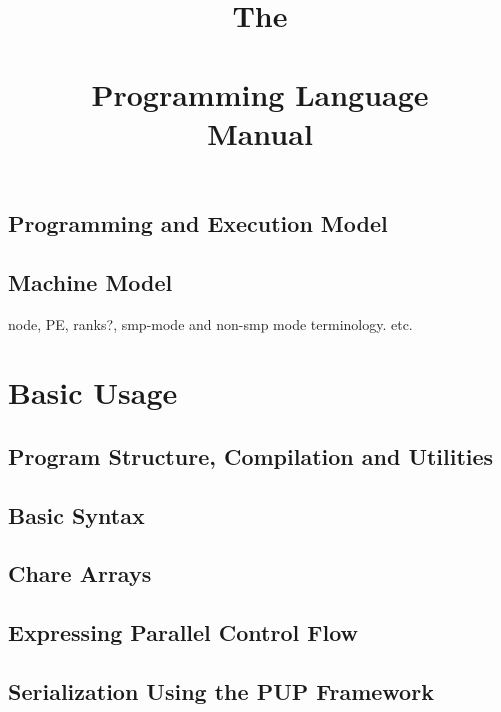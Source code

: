 \documentclass[10pt]{report}
\begin{document}
\title{The\\ \charmpp\\ Programming Language\\ Manual}
\credits{\hspace{0 in}}
\maketitle


\chapter{Programming and Execution Model}



\chapter{Machine Model}
node, PE, ranks?, smp-mode and non-smp mode terminology. etc.

\part{Basic Usage}

\chapter{Program Structure, Compilation and Utilities}
  	
  
  

\chapter{Basic Syntax}
  	
  
  

\chapter{Chare Arrays}
  

\chapter{Expressing Parallel Control Flow}
  

\chapter{Serialization Using the PUP Framework}
  
\end{document}
